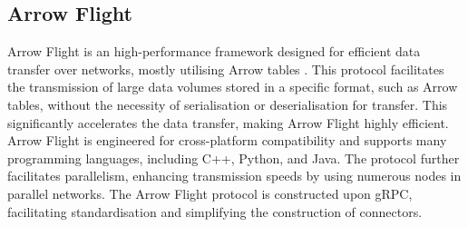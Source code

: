 \subsection{Arrow Flight}
Arrow Flight is an high-performance framework designed for efficient data transfer over networks, mostly utilising Arrow tables \cite{wesmIntroducingApacheArrow2019}. This protocol facilitates the transmission of large data volumes stored in a specific format, such as Arrow tables, without the necessity of serialisation or deserialisation for transfer. This significantly accelerates the data transfer, making Arrow Flight highly efficient. Arrow Flight is engineered for cross-platform compatibility and supports many programming languages, including C++, Python, and Java. The protocol further facilitates parallelism, enhancing transmission speeds by using numerous nodes in parallel networks. The Arrow Flight protocol is constructed upon gRPC, facilitating standardisation and simplifying the construction of connectors.
